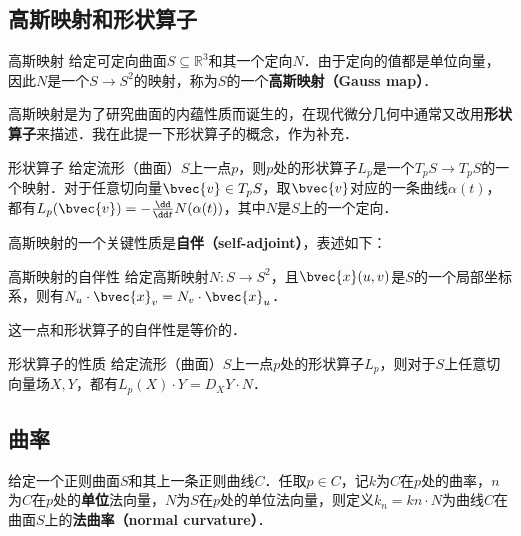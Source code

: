 
\subsection{高斯映射和形状算子}
\begin{definition}{高斯映射}
给定可定向曲面$S\subseteq\mathbb{R}^3$和其一个定向$N$．由于定向的值都是单位向量，因此$N$是一个$S\to S^2$的映射，称为$S$的一个\textbf{高斯映射（Gauss map）}．
\end{definition}

高斯映射是为了研究曲面的内蕴性质而诞生的，在现代微分几何中通常又改用\textbf{形状算子}来描述．我在此提一下形状算子的概念，作为补充．

\begin{definition}{形状算子}
给定流形（曲面）$S$上一点$p$，则$p$处的形状算子$L_p$是一个$T_pS\to T_pS$的一个映射．对于任意切向量$\bvec{v}\in T_pS$，取$\bvec{v}$对应的一条曲线$\alpha(t)$，都有$L_p(\bvec{v})=-\frac{\dd}{\dd t}N(\alpha(t))$，其中$N$是$S$上的一个定向．
\end{definition}


高斯映射的一个关键性质是\textbf{自伴（self-adjoint）}，表述如下：

\begin{theorem}{高斯映射的自伴性}
给定高斯映射$N:S\to S^2$，且$\bvec{x}(u, v)$是$S$的一个局部坐标系，则有$N_u\cdot \bvec{x}_v=N_v\cdot \bvec{x}_u$．
\end{theorem}

这一点和形状算子的自伴性是等价的．

\begin{theorem}{形状算子的性质}
给定流形（曲面）$S$上一点$p$处的形状算子$L_p$，则对于$S$上任意切向量场$X, Y$，都有$L_p(X)\cdot Y=D_XY\cdot N$．
\end{theorem}

\subsection{曲率}

\begin{definition}{}
给定一个正则曲面$S$和其上一条正则曲线$C$．任取$p\in C$，记$k$为$C$在$p$处的曲率，$n$为$C$在$p$处的\textbf{单位}法向量，$N$为$S$在$p$处的单位法向量，则定义$k_n=kn\cdot N$为曲线$C$在曲面$S$上的\textbf{法曲率（normal curvature）}．
\end{definition}

